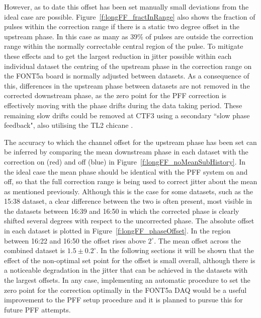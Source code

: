 However, as to date this offset has been set manually small deviations from the ideal case are possible. Figure~\ref{f:longFF_fractInRange} also shows the fraction of pulses within the correction range if there is a static two degree offset in the upstream phase. In this case as many as 39\% of pulses are outside the correction range within the normally correctable central region of the pulse. To mitigate these effects and to get the largest reduction in jitter possible within each individual dataset the centring of the upstream phase in the correction range on the FONT5a board is normally adjusted between datasets. As a consequence of this, differences in the upstream phase between datasets are not removed in the corrected downstream phase, as the zero point for the PFF correction is effectively moving with the phase drifts during the data taking period. These remaining slow drifts could be removed at CTF3 using a secondary ``slow phase feedback", also utilising the TL2 chicane \cite{jackLCWS14}.

The accuracy to which the channel offset for the upstream phase has been set can be inferred by comparing the mean downstream phase in each dataset with the correction on (red) and off (blue) in Figure~\ref{f:longFF_noMeanSubHistory}. In the ideal case the mean phase should be identical with the PFF system on and off, so that the full correction range is being used to correct jitter about the mean as mentioned previously. Although this is the case for some datasets, such as the 15:38 dataset, a clear difference between the two is often present, most visible in the datasets between 16:39 and 16:50 in which the corrected phase is clearly shifted several degrees with respect to the uncorrected phase. The absolute offset in each dataset is plotted in Figure~\ref{f:longFF_phaseOffset}. In the region between 16:22 and 16:50 the offset rises above \(2^\circ\). The mean offset across the combined dataset is \(1.5\pm0.2^\circ\). In the following sections it will be shown that the effect of the non-optimal set point for the offset is small overall, although there is a noticeable degradation in the jitter that can be achieved in the datasets with the largest offsets. In any case, implementing an automatic procedure to set the zero point for the correction optimally in the FONT5a DAQ would be a useful improvement to the PFF setup procedure and it is planned to pursue this for future PFF attempts.

